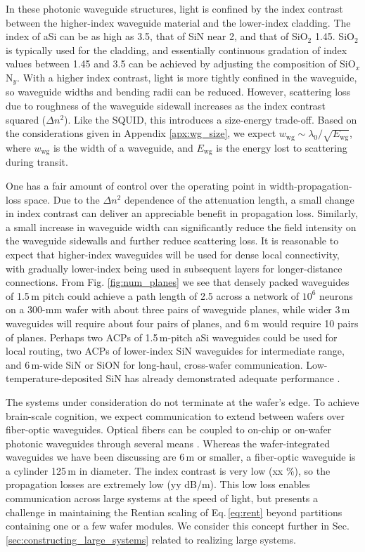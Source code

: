 \documentclass[twocolumn]{article}
\begin{document}
In these photonic waveguide structures, light is confined by the index contrast between the higher-index waveguide material and the lower-index cladding. The index of aSi can be as high as 3.5, that of SiN near 2, and that of SiO$_2$ 1.45. SiO$_2$ is typically used for the cladding, and essentially continuous gradation of index values between 1.45 and 3.5 can be achieved by adjusting the composition of SiO$_x$N$_y$. With a higher index contrast, light is more tightly confined in the waveguide, so waveguide widths and bending radii can be reduced. However, scattering loss due to roughness of the waveguide sidewall increases as the index contrast squared \cite{li2005} ($\Delta n^2$). Like the SQUID, this introduces a size-energy trade-off. Based on the considerations given in Appendix \ref{apx:wg_size}, we expect $w_{\mathrm{wg}} \sim \lambda_0/\sqrt{E_{\mathrm{wg}}}$, where $w_{\mathrm{wg}}$ is the width of a waveguide, and $E_{\mathrm{wg}}$ is the energy lost to scattering during transit. 

One has a fair amount of control over the operating point in width-propagation-loss space. Due to the $\Delta n^2$ dependence of the attenuation length, a small change in index contrast can deliver an appreciable benefit in propagation loss. Similarly, a small increase in waveguide width can significantly reduce the field intensity on the waveguide sidewalls and further reduce scattering loss. It is reasonable to expect that higher-index waveguides will be used for dense local connectivity, with gradually lower-index being used in subsequent layers for longer-distance connections. From Fig. \ref{fig:num_planes} we see that densely packed waveguides of 1.5\,\textmu m pitch could achieve a path length of 2.5 across a network of $10^6$ neurons on a 300-mm wafer with about three pairs of waveguide planes, while wider 3\,\textmu m waveguides will require about four pairs of planes, and 6\,\textmu m would require 10 pairs of planes. Perhaps two ACPs of 1.5\,\textmu m-pitch aSi waveguides could be used for local routing, two ACPs of lower-index SiN waveguides for intermediate range, and 6\,\textmu m-wide SiN or SiON for long-haul, cross-wafer communication. Low-temperature-deposited SiN has already demonstrated adequate performance \cite{chna2018}.

The systems under consideration do not terminate at the wafer's edge. To achieve brain-scale cognition, we expect communication to extend between wafers over fiber-optic waveguides. Optical fibers can be coupled to on-chip or on-wafer photonic waveguides through several means \cite{Rev1,Rev2,Rev3,khbu2020}. Whereas the wafer-integrated waveguides we have been discussing are 6\,\textmu m or smaller, a fiber-optic waveguide is a cylinder 125\,\textmu m in diameter. The index contrast is very low (xx \%), so the propagation losses are extremely low (yy dB/m). This low loss enables communication across large systems at the speed of light, but presents a challenge in maintaining the Rentian scaling of Eq.\,\ref{eq:rent} beyond partitions containing one or a few wafer modules. We consider this concept further in Sec.\,\ref{sec:constructing_large_systems} related to realizing large systems.
\end{document}
